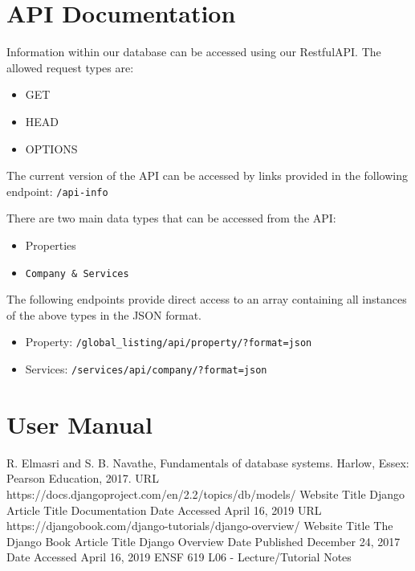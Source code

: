 \documentclass[12pt,a4paper]{report}
\begin{document}
\section{API Documentation}
Information within our database can be accessed using our RestfulAPI. The allowed request types are: 
\begin{itemize}
\item GET
\item HEAD
\item OPTIONS
\end{itemize}

The current version of the API can be accessed by links provided in the following endpoint: \verb|/api-info| \par 

There are two main data types that can be accessed from the API: 
\begin{itemize}
\item Properties
\item \verb|Company & Services|
\end{itemize}

The following endpoints provide direct access to an array containing all instances of the above types in the JSON format.

\begin{itemize}
\item Property: \verb|/global_listing/api/property/?format=json|
\item Services: \verb|/services/api/company/?format=json|
\end{itemize}

\newpage
\section{User Manual}


\newpage
\begin{appendix}
  \listoffigures
\end{appendix}


\begin{thebibliography}{10}
 R. Elmasri and S. B. Navathe, Fundamentals of database systems. Harlow, Essex: Pearson Education, 2017.
 URL https://docs.djangoproject.com/en/2.2/topics/db/models/
Website Title Django
Article Title Documentation
Date Accessed April 16, 2019
 URL https://djangobook.com/django-tutorials/django-overview/
Website Title The Django Book
Article Title Django Overview
Date Published December 24, 2017
Date Accessed April 16, 2019
 ENSF 619 L06 - Lecture/Tutorial Notes
\end{thebibliography}
\end{document}

